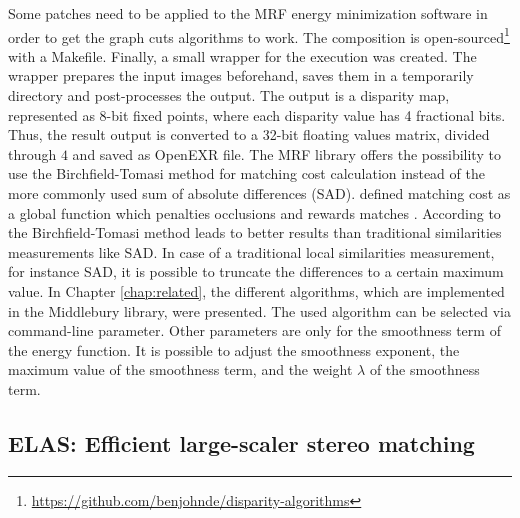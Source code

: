 \noindent Some patches need to be applied to the MRF energy minimization software in order to get the graph cuts algorithms to work.
The composition is open-sourced\footnote{\url{https://github.com/benjohnde/disparity-algorithms}} with a Makefile.
Finally, a small wrapper for the execution was created.
The wrapper prepares the input images beforehand, saves them in a temporarily directory and post-processes the output.
The output is a disparity map, represented as 8-bit fixed points, where each disparity value has 4 fractional bits.
Thus, the result output is converted to a 32-bit floating values matrix, divided through $4$ and saved as OpenEXR file.
\newline\newline\noindent The MRF library offers the possibility to use the Birchfield-Tomasi method for matching cost calculation instead of the more commonly used sum of absolute differences (SAD).
\citeauthor{birchfield1999depth} defined matching cost as a global function which penalties occlusions and rewards matches \citep{birchfield1999depth}.
According to \citep{scharstein2002taxonomy, hirschmuller2007evaluation} the Birchfield-Tomasi method leads to better results than traditional similarities measurements like SAD.
In case of a traditional local similarities measurement, for instance SAD, it is possible to truncate the differences to a certain maximum value.
In Chapter \ref{chap:related}, the different algorithms, which are implemented in the Middlebury library, were presented.
The used algorithm can be selected via command-line parameter.
Other parameters are only for the smoothness term of the energy function.
It is possible to adjust the smoothness exponent, the maximum value of the smoothness term, and the weight $\lambda$ of the smoothness term.

\subsection*{ELAS: Efficient large-scaler stereo matching}

